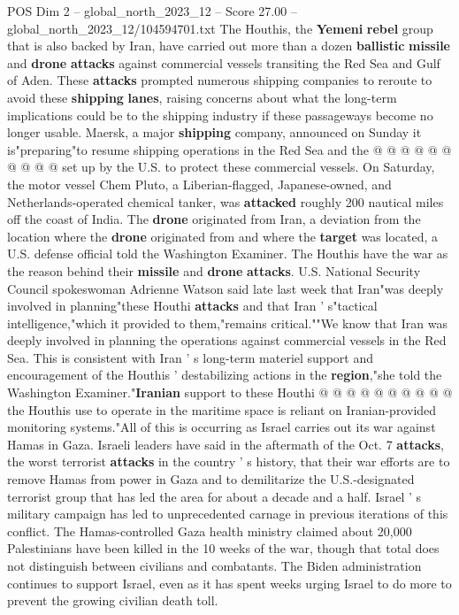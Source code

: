 \begin{textsample}{POS Dim 2 – global\_north\_2023\_12 – Score 27.00 – global\_north\_2023\_12/104594701.txt}
The Houthis, the \textbf{Yemeni} \textbf{rebel} group that is also backed by Iran, have carried out more than a dozen \textbf{ballistic} \textbf{missile} and \textbf{drone} \textbf{attacks} against commercial vessels transiting the Red Sea and Gulf of Aden.
These \textbf{attacks} prompted numerous shipping companies to reroute to avoid these \textbf{shipping} \textbf{lanes}, raising concerns about what the long-term implications could be to the shipping industry if these passageways become no longer usable.
Maersk, a major \textbf{shipping} company, announced on Sunday it is"preparing"to resume shipping operations in the Red Sea and the @ @ @ @ @ @ @ @ @ @ set up by the U.S. to protect these commercial vessels.
On Saturday, the motor vessel Chem Pluto, a Liberian-flagged, Japanese-owned, and Netherlands-operated chemical tanker, was \textbf{attacked} roughly 200 nautical miles off the coast of India.
The \textbf{drone} originated from Iran, a deviation from the location where the \textbf{drone} originated from and where the \textbf{target} was located, a U.S. defense official told the Washington Examiner.
The Houthis have the war as the reason behind their \textbf{missile} and \textbf{drone} \textbf{attacks}.
U.S.
National Security Council spokeswoman Adrienne Watson said late last week that Iran"was deeply involved in planning"these Houthi \textbf{attacks} and that Iran ' s"tactical intelligence,"which it provided to them,"remains critical.""We know that Iran was deeply involved in planning the operations against commercial vessels in the Red Sea.
This is consistent with Iran ' s long-term materiel support and encouragement of the Houthis ' destabilizing actions in the \textbf{region},"she told the Washington Examiner."\textbf{Iranian} support to these Houthi @ @ @ @ @ @ @ @ @ @ the Houthis use to operate in the maritime space is reliant on Iranian-provided monitoring systems."All of this is occurring as Israel carries out its war against Hamas in Gaza.
Israeli leaders have said in the aftermath of the Oct. 7 \textbf{attacks}, the worst terrorist \textbf{attacks} in the country ' s history, that their war efforts are to remove Hamas from power in Gaza and to demilitarize the U.S.-designated terrorist group that has led the area for about a decade and a half.
Israel ' s military campaign has led to unprecedented carnage in previous iterations of this conflict.
The Hamas-controlled Gaza health ministry claimed about 20,000 Palestinians have been killed in the 10 weeks of the war, though that total does not distinguish between civilians and combatants.
The Biden administration continues to support Israel, even as it has spent weeks urging Israel to do more to prevent the growing civilian death toll.

\end{textsample}
